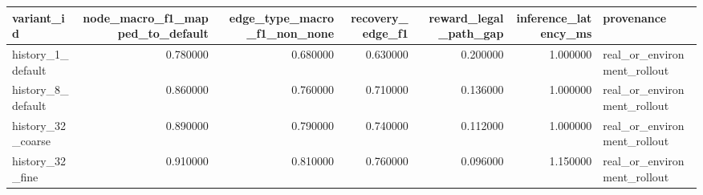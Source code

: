 \begin{tabular}{lrrrrrl}
\toprule
variant\_id & node\_macro\_f1\_mapped\_to\_default & edge\_type\_macro\_f1\_non\_none & recovery\_edge\_f1 & reward\_legal\_path\_gap & inference\_latency\_ms & provenance \\
\midrule
history\_1\_default & 0.780000 & 0.680000 & 0.630000 & 0.200000 & 1.000000 & real\_or\_environment\_rollout \\
history\_8\_default & 0.860000 & 0.760000 & 0.710000 & 0.136000 & 1.000000 & real\_or\_environment\_rollout \\
history\_32\_coarse & 0.890000 & 0.790000 & 0.740000 & 0.112000 & 1.000000 & real\_or\_environment\_rollout \\
history\_32\_fine & 0.910000 & 0.810000 & 0.760000 & 0.096000 & 1.150000 & real\_or\_environment\_rollout \\
\bottomrule
\end{tabular}


